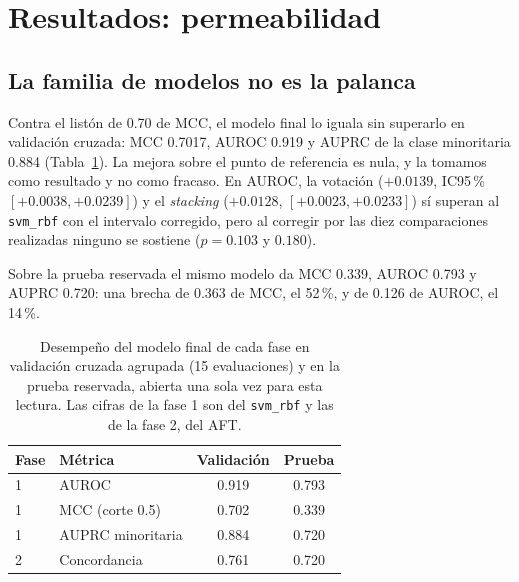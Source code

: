 \documentclass[twocolumn,10pt,letterpaper]{article}
\begin{document}
\section{Resultados: permeabilidad}

\subsection{La familia de modelos no es la palanca}

Contra el listón de 0.70 de MCC, el modelo final lo iguala sin superarlo en validación cruzada: MCC 0.7017, AUROC 0.919 y AUPRC de la clase minoritaria 0.884 (Tabla~\ref{tab:resumen}). La mejora sobre el punto de referencia es nula, y la tomamos como resultado y no como fracaso. En AUROC, la votación ($+0.0139$, IC95\,\% $[+0.0038, +0.0239]$) y el \emph{stacking} ($+0.0128$, $[+0.0023, +0.0233]$) sí superan al \texttt{svm\_rbf} con el intervalo corregido, pero al corregir por las diez comparaciones realizadas ninguno se sostiene ($p = 0.103$ y $0.180$).

Sobre la prueba reservada el mismo modelo da MCC 0.339, AUROC 0.793 y AUPRC 0.720: una brecha de 0.363 de MCC, el 52\,\%, y de 0.126 de AUROC, el 14\,\%.

\begin{table}[t]
  \centering
  \caption{Desempeño del modelo final de cada fase en validación cruzada agrupada (15 evaluaciones) y en la prueba reservada, abierta una sola vez para esta lectura. Las cifras de la fase 1 son del \texttt{svm\_rbf} y las de la fase 2, del AFT.}
  \label{tab:resumen}
  \small
  \begin{tabular}{llcc}
    \toprule
    Fase & Métrica & Validación & Prueba \\
    \midrule
    1 & AUROC            & 0.919 & 0.793 \\
    1 & MCC (corte 0.5)  & 0.702 & 0.339 \\
    1 & AUPRC minoritaria& 0.884 & 0.720 \\
    2 & Concordancia     & 0.761 & 0.720 \\
    \bottomrule
  \end{tabular}
\end{table}
\end{document}
